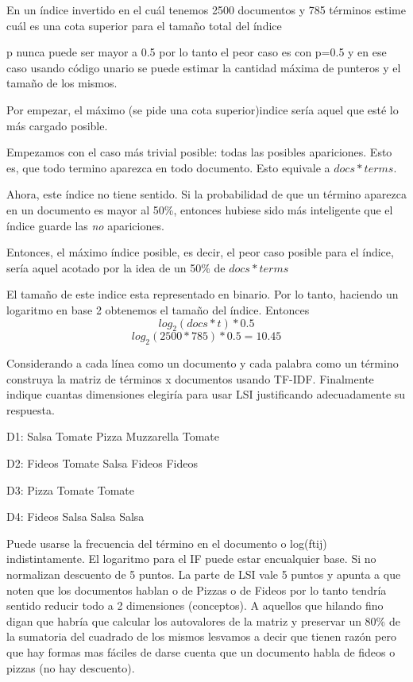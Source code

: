 \documentclass[a4paper]{article}
\newenvironment{enunciado}[3]{%
    \vspace{\baselineskip}
    \tcolorbox[beamer,%
    noparskip,breakable,
    colback=LightGreen,colframe=DarkGreen,%
    colbacklower=LimeGreen!75!LightGreen,%
    title=\small Enunciado: Año #1\, Cuatrimestre #2\, Oportunidad #3]}%
    {\endtcolorbox}
\newenvironment{criterio}[3]{%
    \tcolorbox[beamer,%
    noparskip,breakable,
    colback=LightCoral,colframe=DarkRed,%
    colbacklower=Tomato!75!LightCoral,%
    title=\small Criterio de Corrección: Año #1\, Cuatrimestre #2\, Oportunidad #3]}%
    {\endtcolorbox}
\begin{document}
    \begin{enunciado}{2014}{1}{2}
        En un índice invertido en el cuál tenemos 2500 documentos y   785   términos  estime  cuál  es  una  cota  superior   para   el tamaño total del índice
    \end{enunciado}

    \begin{criterio}{2014}{1}{2}
        p nunca puede ser mayor a 0.5 por lo tanto el peor caso es con p=0.5 y en ese caso usando código  unario se puede estimar la cantidad máxima de punteros y el tamaño de los mismos.
    \end{criterio}

	Por empezar, el máximo (se pide una cota superior)indice sería aquel que esté lo más cargado posible. 
	
	Empezamos con el caso más trivial posible: todas las posibles apariciones. Esto es, que todo termino aparezca en todo documento. Esto equivale a $docs*terms$. 

	Ahora, este índice no tiene sentido. Si la probabilidad de que un término aparezca en un documento es mayor al 50\%, entonces hubiese sido más inteligente que el índice guarde las \textit{no} apariciones.

	Entonces, el máximo índice posible, es decir, el peor caso posible para el índice, sería aquel acotado por la idea de un 50\% de $docs*terms$
	
    El tamaño de este indice esta representado en binario. Por lo tanto, haciendo un logaritmo en base 2 obtenemos el tamaño del índice. Entonces $$log_2(docs*t)*0.5$$ $$log_2(2500*785)*0.5 = 10.45$$

    \begin{enunciado}{2014}{2}{1}
        Considerando   a   cada   línea   como   un   documento   y   cada palabra como un término construya la matriz de términos x documentos   usando   TF-IDF.   Finalmente   indique   cuantas dimensiones elegiría para usar LSI justificando adecuadamente su respuesta. 
        
        D1: Salsa Tomate Pizza Muzzarella Tomate
        
        D2: Fideos Tomate Salsa Fideos Fideos
        
        D3: Pizza Tomate Tomate
        
        D4: Fideos Salsa Salsa Salsa
    \end{enunciado}

    \begin{criterio}{2014}{1}{2}
        Puede usarse la frecuencia del término en el documento o log(ftij) indistintamente. El logaritmo para el IF puede estar encualquier base. Si no normalizan descuento de 5 puntos. La parte de LSI vale 5 puntos y apunta a que noten que los documentos hablan o de Pizzas o de Fideos por lo tanto tendría sentido reducir todo a 2 dimensiones (conceptos). A aquellos que hilando fino digan que habría que calcular los autovalores de la matriz y preservar un 80\% de la sumatoria del cuadrado de los mismos lesvamos a decir que tienen razón pero que hay formas mas fáciles de darse cuenta que un documento habla de fideos o pizzas (no hay descuento).
    \end{criterio}
\end{document}
